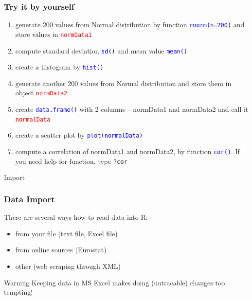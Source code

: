 \documentclass[12pt]{beamer}\usepackage[]{graphicx}\usepackage[]{color}
\begin{document}
\begin{frame}
\frametitle{Try it by yourself}

\begin{enumerate}
 \item generate 200 values from Normal distribution by function \textcolor{blue}{\texttt{rnorm(n=200)}} and store values in \textcolor{red}{\texttt{normData1}}
 \item compute standard deviation \textcolor{blue}{\texttt{sd()}} and mean value \textcolor{blue}{\texttt{mean()}}
 \item create a histogram by \textcolor{blue}{\texttt{hist()}}
 \item generate another 200 values from Normal distribution and store them in object \textcolor{red}{\texttt{normData2}}
 \item create \textcolor{blue}{\texttt{data.frame()}} with 2 columns -- normData1 and normData2 and call it \textcolor{red}{\texttt{normalData}}
 \item create a scatter plot by \textcolor{blue}{\texttt{plot(normalData)}}
 \item compute a correlation of normData1 and normData2, by function \textcolor{blue}{\texttt{cor()}}. If you need help for function, type \texttt{?cor}
\end{enumerate}

\end{frame}


\begin{frame}\Huge\centering
Import
\end{frame}


\begin{frame}\large
\frametitle{Data Import}

There are several ways how to read data into R:

\begin{itemize}
 \item from your file (text file, Excel file)
 \item from online sources (Eurostat)
 \item other (web scraping through XML)
\end{itemize}

\begin{block}{Warning}
  Keeping data in MS Excel makes doing (untracable) changes too tempting!
\end{block}

\end{frame}
\end{document}
